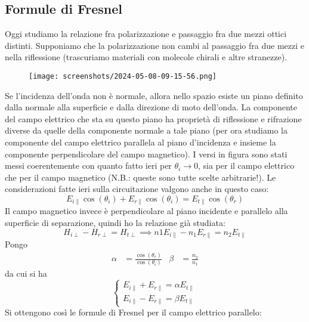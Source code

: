 \subsection{Formule di Fresnel}
Oggi studiamo la relazione fra polarizzazione e passaggio fra due mezzi ottici distinti. Supponiamo che la polarizzazione non cambi al passaggio fra due mezzi e nella riflessione (trascuriamo materiali con molecole chirali e altre stranezze).
\begin{figure}[H]
	\centering
	\texttt{[image: screenshots/2024-05-08-09-15-56.png]}
\end{figure}
Se l'incidenza dell'onda non è normale, allora nello spazio esiste un piano definito dalla normale alla superficie e dalla direzione di moto dell'onda. La componente del campo elettrico che sta su questo piano ha proprietà di riflessione e rifrazione diverse da quelle della componente normale a tale piano (per ora studiamo la componente del campo elettrico parallela al piano d'incidenza e insieme la componente perpendicolare del campo magnetico). I versi in figura sono stati messi coerentemente con quanto fatto ieri per \(\theta _i \to 0\), sia per il campo elettrico che per il campo magnetico (N.B.: queste sono tutte scelte arbitrarie!).
Le considerazioni fatte ieri sulla circuitazione valgono anche in questo caso:
\begin{equation}
	E_{i \parallel} \cos (\theta _i) + E_{r \parallel} \cos (\theta _i) = E_{t \parallel} \cos (\theta _r)
\end{equation}
Il campo magnetico invece è perpendicolare al piano incidente e parallelo alla superficie di separazione, quindi ho la relazione già studiata:
\begin{equation}
	H_{i \perp } - H_{r \perp } = H_{t \perp } \implies n1 E_{i \parallel} - n_1 E_{r \parallel} = n_2 E_{t \parallel}
\end{equation}
Pongo
\begin{align}
	\alpha &= \frac{\cos (\theta _r)}{\cos (\theta _i)} &
	\beta &= \frac{n_2}{n_1}
\end{align}
da cui si ha
\begin{equation}
	\begin{cases}
		E_{i \parallel} + E_{r \parallel} = \alpha E_{t \parallel}\\
		E_{i \parallel} - E_{r \parallel} = \beta E_{t \parallel}	
	\end{cases}
\end{equation}
Si ottengono così le formule di Fresnel per il campo elettrico parallelo:
